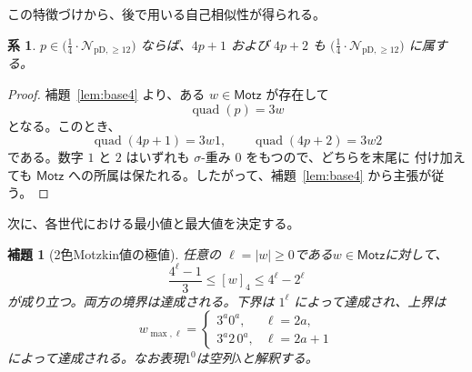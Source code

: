 \documentclass[12pt]{ltjsarticle}
\theoremstyle{plain}
\newtheorem{lemma}[theorem]{補題}
\newtheorem{corollary}[theorem]{系}
\theoremstyle{definition}
\theoremstyle{plain}
\newcommand{\Pset}{%
  \bigl(\tfrac{1}{4}\cdot\mathcal{N}_{\mathrm{pD},\geq 12}\bigr)%
}
\begin{document}
この特徴づけから、後で用いる自己相似性が得られる。

\begin{corollary}\label{cor:Pclosure}
$p\in\Pset$ ならば、$4p+1$ および $4p+2$ も $\Pset$ に属する。
\end{corollary}

\begin{proof}
補題~\ref{lem:base4} より、ある $w\in\mathsf{Motz}$ が存在して
\[
 \operatorname{quad}(p)=3w
\]
となる。このとき、
\[
 \operatorname{quad}(4p+1)=3w1,
 \qquad
 \operatorname{quad}(4p+2)=3w2
\]
である。数字 $1$ と $2$ はいずれも $\sigma$-重み $0$ をもつので、どちらを末尾に
付け加えても $\mathsf{Motz}$ への所属は保たれる。したがって、補題~\ref{lem:base4}
から主張が従う。
\end{proof}

次に、各世代における最小値と最大値を決定する。

\begin{lemma}[2色Motzkin値の極値]\label{lem:extremal}
任意の $\ell=|w|\geq0$である$w\in\mathsf{Motz}$に対して、
\begin{equation}\label{eq:motzkin-extrema}
  \frac{4^{\ell}-1}{3}\leq[w]_4\leq4^{\ell}-2^{\ell}
\end{equation}
が成り立つ。両方の境界は達成される。下界は $1^{\ell}$ によって達成され、上界は
\[
  w_{\max,\ell}=
  \begin{cases}
    3^a0^a,&\ell=2a,\\
    3^a2\,0^a,&\ell=2a+1
  \end{cases}
\]
によって達成される。なお表現$1^0$は空列$\lambda$と解釈する。
\end{lemma}
\end{document}
